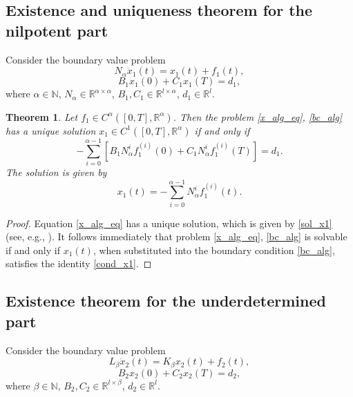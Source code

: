 \documentclass[preprint,12pt]{elsarticle}
\numberwithin{equation}{section}
\newtheorem{theorem}{Theorem}[section]
\theoremstyle{definition}
\begin{document}
\subsection{Existence and uniqueness theorem for the nilpotent part}
Consider the boundary value problem
\begin{equation}\label{x_alg_eq}
N_{\alpha}\dot{x}_1(t)=x_1(t)+f_1(t),
\end{equation}
   \begin{equation}\label{bc_alg}
    B_1x_1(0)+C_1x_1(T)=d_1,\end{equation}
    where $\alpha\in\mathbb{N}$, $N_{\alpha}\in\mathbb{R}^{\alpha\times\alpha}$, $B_1, C_1 \in\mathbb{R}^{l\times\alpha}$, $d_1\in\mathbb{R}^l$.
\begin{theorem}\label{th_nilpotent}
    Let $f_1\in C^{\alpha}([0,T],\mathbb{R}^{\alpha})$. Then the problem \eqref{x_alg_eq}, \eqref{bc_alg} has a unique solution $x_1\in C^1([0,T],\mathbb{R}^{\alpha})$ if and only if
    \begin{equation}\label{cond_x1}
        -\sum\limits_{i=0}^{\alpha-1}\left[B_1N_{\alpha}^i f_1^{(i)}(0)+C_1N_{\alpha}^i f_1^{(i)}(T)\right]=d_1.
    \end{equation}
   The solution is given by \begin{equation}\label{sol_x1}
        x_1(t)=-\sum\limits_{i=0}^{\alpha-1}N_{\alpha}^i f_1^{(i)}(t).
    \end{equation}
\end{theorem}
\begin{proof} Equation \eqref{x_alg_eq} has a unique solution, which is given by \eqref{sol_x1} (see, e.g., \cite[Lemma 2.8]{Kunkel:2006}). It follows immediately that problem \eqref{x_alg_eq}, \eqref{bc_alg} is solvable if and only if $x_1(t)$,  when substituted into the boundary condition \eqref{bc_alg}, satisfies the identity \eqref{cond_x1}.
\end{proof}


\subsection{Existence theorem for the underdetermined part}\label{Subsection_UNDERDET_PART}
Consider the boundary value problem \begin{equation}\label{x_under_eq}
L_{\beta}\dot{x}_2 (t)=K_{\beta}x_2(t)+
f_2(t),
\end{equation}
\begin{equation}\label{bc_under}
    B_2x_2(0)+C_2x_2(T)=d_2,\end{equation}
where $\beta\in\mathbb{N}$, $B_2, C_2 \in\mathbb{R}^{l\times\beta}$, $d_2\in\mathbb{R}^l$.
\end{document}
